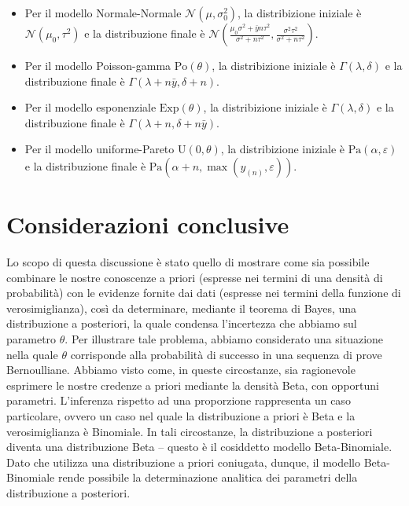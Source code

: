 \documentclass[
  10pt,
  italian,
  a4paper,
  extrafontsizes,onecolumn,openright
  ]{memoir}
\theoremstyle{definition}
\theoremstyle{definition}
\theoremstyle{definition}
\theoremstyle{definition}
\theoremstyle{remark}
\begin{document}
\begin{itemize}
\item
  Per il modello Normale-Normale \(\mathcal{N}(\mu, \sigma^2_0)\), la distribizione iniziale è \(\mathcal{N}(\mu_0, \tau^2)\) e la distribuzione finale è \(\mathcal{N}\left(\frac{\mu_0\sigma^2 + \bar{y}n\tau^2}{\sigma^2 + n\tau^2}, \frac{\sigma^2\tau^2}{\sigma^2 + n\tau^2} \right)\).
\item
  Per il modello Poisson-gamma \(\text{Po}(\theta)\), la distribizione iniziale è \(\Gamma(\lambda, \delta)\) e la distribuzione finale è \(\Gamma(\lambda + n \bar{y}, \delta +n)\).
\item
  Per il modello esponenziale \(\text{Exp}(\theta)\), la distribizione iniziale è \(\Gamma(\lambda, \delta)\) e la distribuzione finale è \(\Gamma(\lambda + n, \delta +n\bar{y})\).
\item
  Per il modello uniforme-Pareto \(\text{U}(0, \theta)\), la distribizione iniziale è \(\mbox{Pa}(\alpha, \varepsilon)\) e la distribuzione finale è \(\mbox{Pa}(\alpha + n, \max(y_{(n)}, \varepsilon))\).
\end{itemize}

\hypertarget{considerazioni-conclusive}{%
\section*{Considerazioni conclusive}\label{considerazioni-conclusive}}

Lo scopo di questa discussione è stato quello di mostrare come sia possibile combinare le nostre conoscenze a priori (espresse nei termini di una densità di probabilità) con le evidenze fornite dai dati (espresse nei termini della funzione di verosimiglianza), così da determinare, mediante il teorema di Bayes, una distribuzione a posteriori, la quale condensa l'incertezza che abbiamo sul parametro \(\theta\). Per illustrare tale problema, abbiamo considerato una situazione nella quale \(\theta\) corrisponde alla probabilità di successo in una sequenza di prove Bernoulliane. Abbiamo visto come, in queste circostanze, sia ragionevole esprimere le nostre credenze a priori mediante la densità Beta, con opportuni parametri. L'inferenza rispetto ad una proporzione rappresenta un caso particolare, ovvero un caso nel quale la distribuzione a priori è Beta e la verosimiglianza è Binomiale. In tali circostanze, la distribuzione a posteriori diventa una distribuzione Beta -- questo è il cosiddetto modello Beta-Binomiale. Dato che utilizza una distribuzione a priori coniugata, dunque, il modello Beta-Binomiale rende possibile la determinazione analitica dei parametri della distribuzione a posteriori.
\end{document}
